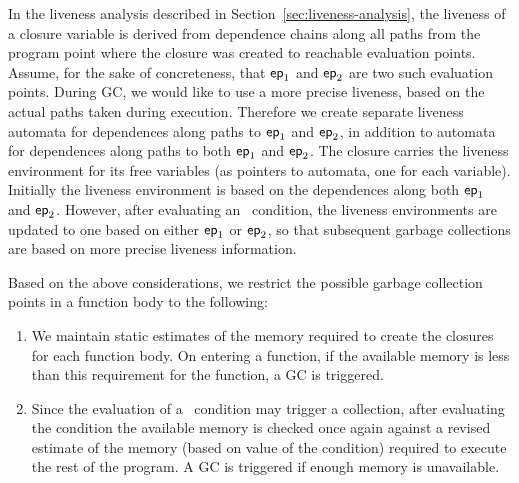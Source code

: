 \documentclass[9pt,preprint,letter,nonatbib]{sigplanconf}
\begin{document}
In        the       liveness        analysis       described        in
Section~\ref{sec:liveness-analysis},   the  liveness   of  a   closure
variable is  derived from dependence  chains along all paths  from the
program point  where the closure  was created to  reachable evaluation
points.  Assume,  for the  sake of  concreteness, that  $\mathsf{ep}_1$ and
$\mathsf{ep}_2$ are two such evaluation points.  During GC,
we would like to use a more precise liveness, based on the actual paths
taken  during  execution.   Therefore   we  create  separate  liveness
automata for dependences  along paths to $\mathsf{ep}_1$  and $\mathsf{ep}_2$, in
addition to  automata for dependences  along paths to  both $\mathsf{ep}_1$
and $\mathsf{ep}_2$.  The closure carries  the liveness environment for its
free  variables (as  pointers  to automata,  one  for each  variable).
Initially the liveness  environment is based on  the dependences along
both  $\mathsf{ep}_1$   and  $\mathsf{ep}_2$.   However,  after   evaluating  an
\SIF\ condition, the liveness environments are updated to one based on
either   $\mathsf{ep}_1$  or   $\mathsf{ep}_2$,  so   that  subsequent   garbage
collections are based on more precise liveness information.

Based on  the above considerations,  we restrict the  possible garbage
collection points in a function body to the following:
\begin{enumerate}
\item We  maintain static estimates  of the memory required  to create
  the closures for each function body.  On entering a function, if the
  available memory is  less than this requirement for  the function, a
  GC is triggered.
\item Since the evaluation of a  \SIF\ condition may trigger a 
  collection, after evaluating the condition   the available memory
  is  checked once  again against  a  revised estimate  of the  memory
  (based on  value of the condition)  required to execute the  rest of
  the program.  A GC is triggered if enough memory is unavailable.
\end{enumerate}



\end{document}
